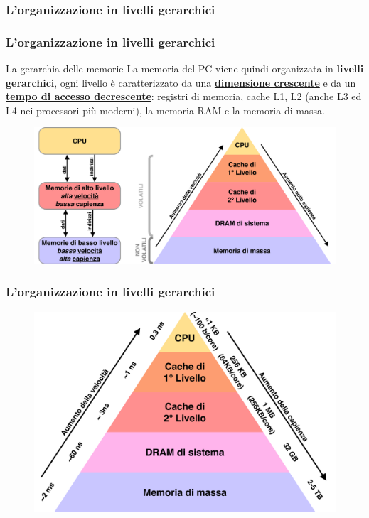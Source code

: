 \subsubsection[L'organizzazione in livelli gerarchici]{L'organizzazione in livelli gerarchici}
\begin{frame}
	\frametitle{L'organizzazione in livelli gerarchici}
	 
	\begin{block}{La gerarchia delle memorie}
		La memoria del PC viene quindi organizzata in \textbf{livelli gerarchici}, ogni livello è caratterizzato da una \underline{\textbf{dimensione crescente}} e da un \underline{\textbf{tempo di accesso decrescente}}: registri di memoria, cache L1, L2 (anche L3 ed L4 nei processori più moderni), la memoria RAM e la memoria di massa.
	\end{block}
	
	\begin{figure}[!htbp] 
		\centering
		\includegraphics[width=0.8\linewidth]{images/5_memory/memory_hierarchy.pdf}
		\label{fig:memory_hierarchy}
	\end{figure} 

\end{frame}


\begin{frame}
	\frametitle{L'organizzazione in livelli gerarchici}

	\begin{figure}[!htbp] 
		\centering
		\includegraphics[width=0.9\linewidth]{images/5_memory/memory_hierarchy_info.pdf}
		\label{fig:memory_hierarchy}
	\end{figure} 

\end{frame}

